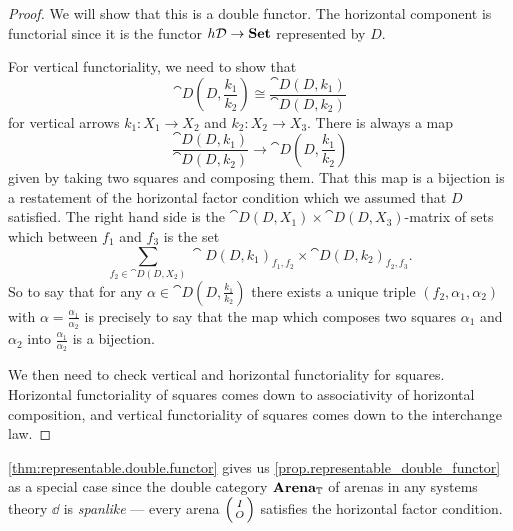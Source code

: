 \documentclass[DynamicalBook]{subfiles}
\begin{document}
\begin{proof}
We will show that this is a double functor. The horizontal component is
functorial since it is the functor $h\mathcal{D} \to \textbf{Set}$ represented by $D$. 

For vertical functoriality, we need to show that
$$\cat{D}\left( D, \frac{k_1}{k_2} \right) \cong \frac{\cat{D}(D,
  k_1)}{\cat{D}(D, k_2)}$$
for vertical arrows $k_1 : X_1 \to X_2$ and $k_2 : X_2 \to X_3$. There is always
a map
$$\frac{\cat{D}(D,
  k_1)}{\cat{D}(D, k_2)} \to \cat{D}\left( D, \frac{k_1}{k_2} \right)$$
given by taking two squares and composing them. That this map is a
bijection is a restatement of the horizontal factor condition which we assumed
that $D$ satisfied. The right hand side is the $\cat{D}(D, X_1) \times
\cat{D}(D, X_3)$-matrix of sets which between $f_1$ and $f_3$ is the set
$$\sum_{f_2 \in \cat{D}(D, X_2)} \cat{D}(D, k_1)_{f_1, f_2} \times \cat{D}(D,
k_2)_{f_2, f_3}.$$
So to say that for any $\alpha \in \cat{D}\left( D,  \frac{k_1}{k_2} \right)$
there exists a unique triple $(f_2, \alpha_1, \alpha_2)$ with $\alpha =
\frac{\alpha_1}{\alpha_2}$ is precisely to say that the map which composes two
squares $\alpha_1$ and $\alpha_2$ into $\frac{\alpha_1}{\alpha_2}$ is a bijection.

We then need to check vertical and horizontal functoriality for squares.
Horizontal functoriality of squares comes down to associativity of horizontal
composition, and vertical functoriality of squares comes down to the interchange law.
\end{proof}

\cref{thm:representable.double.functor} gives us
\cref{prop.representable_double_functor} as a special case since the double
category $\textbf{Arena}_{\mathbb{T}}$ of arenas in any systems theory $\dd$ is \emph{spanlike} --- every arena
$\lens{I}{O}$ satisfies the horizontal factor condition.
\end{document}
